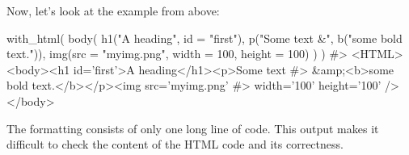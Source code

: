 \documentclass[
]{krantz}
\makeatletter
\newenvironment{Shaded}{\begin{snugshade}}{\end{snugshade}}
\newcommand{\CommentTok}[1]{\textcolor[rgb]{0.56,0.35,0.01}{\textit{#1}}}
\newcommand{\ControlFlowTok}[1]{\textcolor[rgb]{0.13,0.29,0.53}{\textbf{#1}}}
\newcommand{\DataTypeTok}[1]{\textcolor[rgb]{0.13,0.29,0.53}{#1}}
\newcommand{\DecValTok}[1]{\textcolor[rgb]{0.00,0.00,0.81}{#1}}
\newcommand{\KeywordTok}[1]{\textcolor[rgb]{0.13,0.29,0.53}{\textbf{#1}}}
\newcommand{\NormalTok}[1]{#1}
\newcommand{\OperatorTok}[1]{\textcolor[rgb]{0.81,0.36,0.00}{\textbf{#1}}}
\newcommand{\StringTok}[1]{\textcolor[rgb]{0.31,0.60,0.02}{#1}}
\newenvironment{kframe}{%
\medskip{}
\setlength{\fboxsep}{.8em}
 \def\at@end@of@kframe{}%
 \ifinner\ifhmode%
  \def\at@end@of@kframe{\end{minipage}}%
  \begin{minipage}{\columnwidth}%
 \fi\fi%
 \def\FrameCommand##1{\hskip\@totalleftmargin \hskip-\fboxsep
 \colorbox{shadecolor}{##1}\hskip-\fboxsep
     \hskip-\linewidth \hskip-\@totalleftmargin \hskip\columnwidth}%
 \MakeFramed {\advance\hsize-\width
   \@totalleftmargin\z@ \linewidth\hsize
   \@setminipage}}%
 {\par\unskip\endMakeFramed%
 \at@end@of@kframe}
\renewenvironment{Shaded}{\begin{kframe}}{\end{kframe}}
\renewcommand{\KeywordTok} [1]{\textcolor[rgb]{0.00,0.44,0.13}{{#1}}}
\renewcommand{\DataTypeTok}[1]{\textcolor[rgb]{0.56,0.13,0.00}{{#1}}}
\renewcommand{\DecValTok}  [1]{\textcolor[rgb]{0.25,0.63,0.44}{{#1}}}
\renewcommand{\StringTok}  [1]{\textcolor[rgb]{0.25,0.44,0.63}{{#1}}}
\renewcommand{\CommentTok} [1]{\textcolor[rgb]{0.38,0.63,0.69}{{#1}}}
\renewcommand{\NormalTok}  [1]{{#1}}
\makeatother
\begin{document}
\begin{Shaded}
\end{Shaded}

Now, let's look at the example from above:

\begin{Shaded}
\begin{Highlighting}[]
\KeywordTok{with_html}\NormalTok{(}
  \KeywordTok{body}\NormalTok{(}
    \KeywordTok{h1}\NormalTok{(}\StringTok{"A heading"}\NormalTok{, }\DataTypeTok{id =} \StringTok{"first"}\NormalTok{),}
    \KeywordTok{p}\NormalTok{(}\StringTok{"Some text &"}\NormalTok{, }\KeywordTok{b}\NormalTok{(}\StringTok{"some bold text."}\NormalTok{)),}
    \KeywordTok{img}\NormalTok{(}\DataTypeTok{src =} \StringTok{"myimg.png"}\NormalTok{, }\DataTypeTok{width =} \DecValTok{100}\NormalTok{, }\DataTypeTok{height =} \DecValTok{100}\NormalTok{)}
\NormalTok{  )}
\NormalTok{)}
\CommentTok{#> <HTML> <body><h1 id='first'>A heading</h1><p>Some text}
\CommentTok{#> &amp;<b>some bold text.</b></p><img src='myimg.png'}
\CommentTok{#> width='100' height='100' /></body>}
\end{Highlighting}
\end{Shaded}

The formatting consists of only one long line of code. This output makes it difficult to check the content of the HTML code and its correctness.
\end{document}
